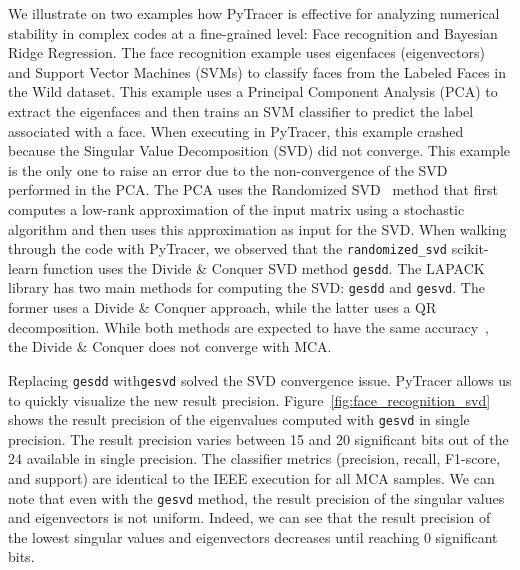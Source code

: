 \documentclass[10pt,journal,compsoc]{IEEEtran}
\newcommand{\pytracer}[0]{PyTracer\xspace}
\DeclareRobustCommand{\add}[1]{\textcolor{ao(english)}{#1}}%
\DeclareRobustCommand{\add}[1]{#1}
\begin{document}
\add{We illustrate on two examples how PyTracer is effective for analyzing
    numerical stability in complex codes at a fine-grained level: Face recognition and Bayesian Ridge Regression.}
The face recognition example uses eigenfaces (eigenvectors) and Support Vector
Machines (SVMs) to classify faces from the Labeled Faces in the Wild dataset.
This example uses a Principal Component Analysis (PCA) to extract the eigenfaces
and then trains an SVM classifier to predict the label associated with a face.
\add{When executing in PyTracer, this example crashed because the Singular Value Decomposition (SVD) did not converge.}
This example is the only one to raise an error due to the
non-convergence of the SVD performed in the PCA.
The PCA uses the Randomized SVD~\cite{halko2011finding} method
that first computes a low-rank approximation of the input matrix using a
stochastic algorithm and then uses this approximation as input for the SVD. 
\add{When walking through the code with PyTracer, we observed that}
the \texttt{randomized\_svd} scikit-learn function uses the Divide \& Conquer SVD
method \texttt{gesdd}. The LAPACK library has two main methods for computing the SVD:
\texttt{gesdd} and \texttt{gesvd}. The former uses a Divide \& Conquer approach,
while the latter uses a QR decomposition. While both methods are expected to
have the same accuracy~\cite{nakatsukasa2013stable}, the Divide \& Conquer
does not converge with MCA.

Replacing \texttt{gesdd} with\texttt{gesvd} solved the SVD convergence issue.
\pytracer allows us to quickly visualize the new \add{result} precision.
Figure~\ref{fig:face_recognition_svd} shows the \add{result} precision of the eigenvalues
computed with \texttt{gesvd} \add{in single precision}. \add{The result precision}
varies between 15 and 20
significant bits out of the 24 available in single precision. The classifier
metrics (precision, recall, F1-score, and support) are identical to the IEEE
execution for all MCA samples. \add{We can note that even with the \texttt{gesvd} method,
    the \add{result} precision of the singular values and eigenvectors is not uniform. 
    Indeed, we can see that the \add{result} precision of the lowest singular values and eigenvectors decreases 
    until reaching 0 significant bits.}
\end{document}
